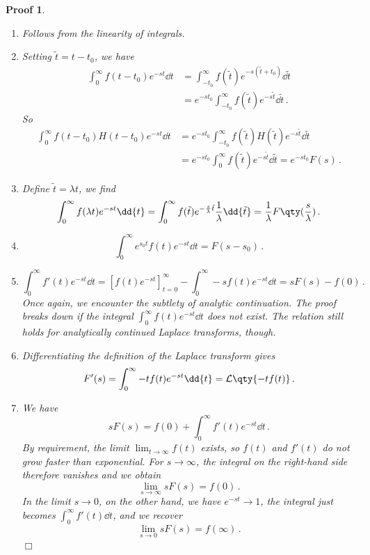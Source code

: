 \documentclass{article}
\theoremstyle{plain}\theoremheaderfont{\normalfont\itshape}\theorembodyfont{\rmfamily}\theoremseparator{.}\newtheorem*{rem}{Remark}\newtheorem*{ex}{Example}\newtheorem*{proof}{Proof}\newtheorem*{altp}{Alternative proof}
\theoremstyle{plain}\theoremheaderfont{\normalfont\bfseries}\theorembodyfont{\rmfamily}\theoremseparator{.}\newtheorem{thm}{Theorem}[section]\newtheorem{lem}[thm]{Lemma}\newtheorem{prop}[thm]{Proposition}\newtheorem*{cor}{Corollary}\newtheorem{defn}[thm]{Definition}\newtheorem{clm}[thm]{Claim}\newtheorem{clminproof}{Claim}
\theoremstyle{break}\theoremheaderfont{\normalfont\itshape}\theorembodyfont{\rmfamily}\theoremseparator{.\medskip}\newtheorem*{proofskip}{Proof}\newtheorem*{exs}{Examples}\newtheorem*{rems}{Remarks}
\theoremstyle{break}\theoremheaderfont{\normalfont\bfseries}\theorembodyfont{\rmfamily}\theoremseparator{.\medskip}\newtheorem{lemskip}[thm]{Lemma}\newtheorem{defnskip}[thm]{Definition}\newtheorem{propskip}[thm]{Proposition}\newtheorem{thmskip}[thm]{Theorem}
\numberwithin{equation}{section}
\newcommand{\qed}{\hfill\ensuremath{\Box}}
\newcommand{\lt}[1]{\mathcal{L}\qty{ #1 }}
\begin{document}
	\begin{proofskip}
		\begin{enumerate}[topsep=0pt]
			\item Follows from the linearity of integrals.
			\item Setting \(\tilde{t}=t-t_0\), we have
			\begin{align*}
				\int_{0}^{\infty}f(t-t_0)e^{-st}\dd{t}&=\int_{-t_0}^{\infty}f(\tilde{t})e^{-s(\tilde{t}+t_0)}\dd{\tilde{t}}\\
				&=e^{-st_0}\int_{-t_0}^{\infty}f(\tilde{t})e^{-s\tilde{t}}\dd{\tilde{t}}\,.
			\end{align*}
			So
			\begin{align*}
				\int_{0}^{\infty}f(t-t_0)H(t-t_0)e^{-st}\dd{t}&=e^{-st_0}\int_{-t_0}^{\infty}f(\tilde{t})H(\tilde{t})e^{-s\tilde{t}}\dd{\tilde{t}}\\
				&=e^{-st_0}\int_{0}^{\infty}f(\tilde{t})e^{-s\tilde{t}}\dd{\tilde{t}}=e^{-st_0}F(s)\,.
			\end{align*}
			\item Define \(\tilde{t}=\lambda t\), we find
			\[\int_{0}^{\infty}f(\lambda t)e^{-st}\dd{t}=\int_{0}^{\infty}f(\tilde{t})e^{-\frac{s}{\lambda}\tilde{t}}\frac{1}{\lambda}\dd{\tilde{t}}=\frac{1}{\lambda}F\qty(\frac{s}{\lambda})\,.\]
			\item 
			\[\int_{0}^{\infty}e^{s_0 t}f(t)e^{-st}\dd{t}=F(s-s_0)\,.\]
			\item
			\[\int_{0}^{\infty}f'(t)e^{-st}\dd{t}=[f(t)e^{-st}]_{t=0}^\infty-\int_{0}^{\infty}-sf(t)e^{-st}\dd{t}=sF(s)-f(0)\,.\]
			Once again, we encounter the subtlety of analytic continuation. The proof breaks down if the integral \(\int_{0}^{\infty} f(t)e^{-st}\dd{t}\) does not exist. The relation still holds for analytically continued Laplace transforms, though.
			\item Differentiating the definition of the Laplace transform gives
			\[F'(s)=\int_{0}^{\infty}-tf(t)e^{-st}\dd{t}=\lt{-tf(t)}\,.\]
			\item We have
			\[sF(s)=f(0)+\int_{0}^{\infty}f'(t)e^{-st}\dd{t}\,.\]
			By requirement, the limit \(\lim_{t\to\infty}f(t)\) exists, so \(f(t)\) and \(f'(t)\) do not grow faster than exponential. For \(s\to\infty\), the integral on the right-hand side therefore vanishes and we obtain
			\[\lim_{s\to \infty}sF(s)=f(0)\,.\]
			In the limit \(s\to 0\), on the other hand, we have \(e^{-st}\to 1\), the integral just becomes \(\int_0^\infty f'(t)\dd{t}\), and we recover
			\[\lim_{s\to 0}sF(s)=f(\infty)\,.\]\qed
		\end{enumerate}
	\end{proofskip}
\end{document}
